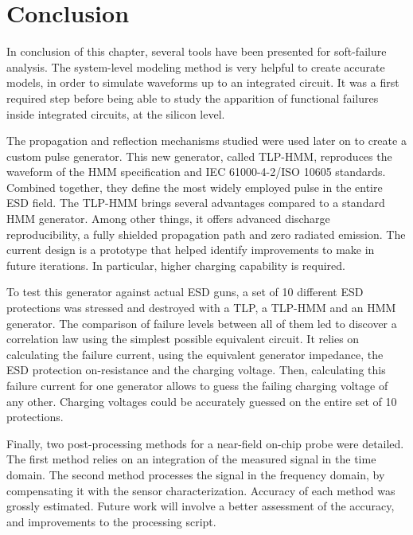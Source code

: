 \section{Conclusion}

In conclusion of this chapter, several tools have been presented for soft-failure analysis.
The system-level modeling method is very helpful to create accurate models, in order to simulate waveforms up to an integrated circuit.
It was a first required step before being able to study the apparition of functional failures inside integrated circuits, at the silicon level.

The propagation and reflection mechanisms studied were used later on to create a custom pulse generator.
This new generator, called TLP-HMM, reproduces the waveform of the HMM specification and IEC 61000-4-2/ISO 10605 standards.
Combined together, they define the most widely employed pulse in the entire ESD field.
The TLP-HMM brings several advantages compared to a standard HMM generator.
Among other things, it offers advanced discharge reproducibility, a fully shielded propagation path and zero radiated emission.
The current design is a prototype that helped identify improvements to make in future iterations.
In particular, higher charging capability is required.

To test this generator against actual ESD guns, a set of 10 different ESD protections was stressed and destroyed with a TLP, a TLP-HMM and an HMM generator.
The comparison of failure levels between all of them led to discover a correlation law using the simplest possible equivalent circuit.
It relies on calculating the failure current, using the equivalent generator impedance, the ESD protection on-resistance and the charging voltage.
Then, calculating this failure current for one generator allows to guess the failing charging voltage of any other.
Charging voltages could be accurately guessed on the entire set of 10 protections.

Finally, two post-processing methods for a near-field on-chip probe were detailed.
The first method relies on an integration of the measured signal in the time domain.
The second method processes the signal in the frequency domain, by compensating it with the sensor characterization.
Accuracy of each method was grossly estimated.
Future work will involve a better assessment of the accuracy, and improvements to the processing script.
